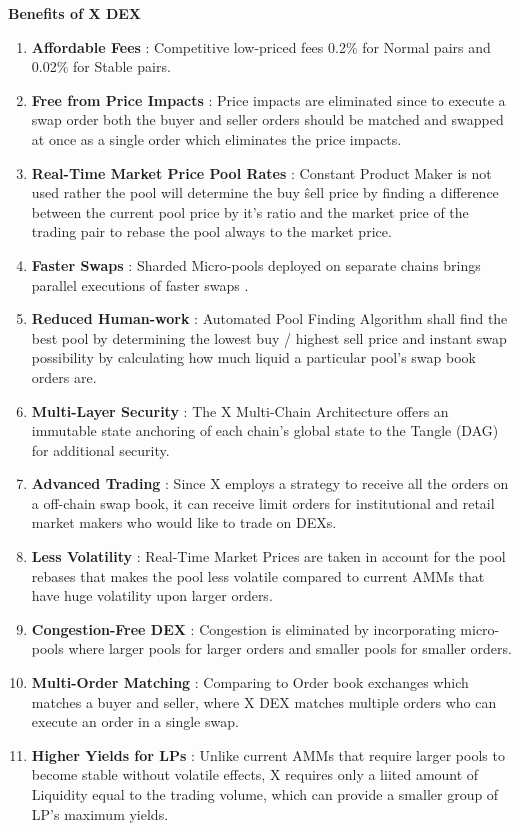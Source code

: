 \documentclass[letterpaper,11pt]{article}
\begin{document}
\textbf{Benefits of X DEX}
\begin{enumerate}[wide, labelwidth=!, labelindent=0pt]
\item \textbf{Affordable Fees} : Competitive low-priced fees 0.2\% for Normal pairs and 0.02\% for Stable pairs.
\item \textbf{Free from Price Impacts} : Price impacts are eliminated since to execute a swap order both the buyer and seller orders should be matched and swapped at once as a single order which eliminates the price impacts.
\item \textbf{Real-Time Market Price Pool Rates} : Constant Product Maker is not used rather the pool will determine the buy \^ sell price by finding a difference between the current pool price by it's ratio and the market price of the trading pair to rebase the pool always to the market price.
\item \textbf{Faster Swaps} : Sharded Micro-pools deployed on separate chains brings parallel executions of faster swaps .
\item \textbf{Reduced Human-work} : Automated Pool Finding Algorithm shall find the best pool by determining the lowest buy / highest sell price and instant swap possibility by calculating how much liquid a particular pool's swap book orders are.
\item \textbf{Multi-Layer Security} : The X Multi-Chain Architecture  offers an immutable state anchoring of each chain's global state to the Tangle (DAG) for additional security.
\item \textbf{Advanced Trading} : Since X employs a strategy to receive all the orders on a off-chain swap book, it can receive limit orders for institutional and retail market makers who would like to trade on DEXs.
\item \textbf{Less Volatility} : Real-Time Market Prices are taken in account for the pool rebases that makes the pool less volatile compared to current AMMs that have huge volatility upon larger orders.
\item \textbf{Congestion-Free DEX} : Congestion is eliminated by incorporating micro-pools where larger pools for larger orders and smaller pools for smaller orders.
\item \textbf{Multi-Order Matching} : Comparing to Order book exchanges which matches a buyer and seller, where X DEX matches multiple orders who can execute an order in a single swap.
\item \textbf{Higher Yields for LPs} : Unlike current AMMs that require larger pools to become stable without volatile effects, X requires only a liited amount of Liquidity equal to the trading volume, which can provide a smaller group of LP's maximum yields.
\end{enumerate}
	
\end{document}
